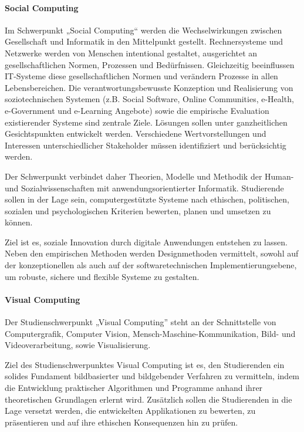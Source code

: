 \paragraph{Social Computing}\label{social-computing}

Im Schwerpunkt „Social Computing`` werden die Wechselwirkungen zwischen
Gesellschaft und Informatik in den Mittelpunkt gestellt. Rechnersysteme
und Netzwerke werden von Menschen intentional gestaltet, ausgerichtet an
gesellschaftlichen Normen, Prozessen und Bedürfnissen. Gleichzeitig
beeinflussen IT-Systeme diese gesellschaftlichen Normen und verändern
Prozesse in allen Lebensbereichen. Die verantwortungsbewusste Konzeption
und Realisierung von soziotechnischen Systemen (z.B. Social Software,
Online Communities, e-Health, e-Government und e-Learning Angebote)
sowie die empirische Evaluation existierender Systeme sind zentrale
Ziele. Lösungen sollen unter ganzheitlichen Gesichtspunkten entwickelt
werden. Verschiedene Wertvorstellungen und Interessen unterschiedlicher
Stakeholder müssen identifiziert und berücksichtig werden.

Der Schwerpunkt verbindet daher Theorien, Modelle und Methodik der
Human- und Sozialwissenschaften mit anwendungsorientierter Informatik.
Studierende sollen in der Lage sein, computergestützte Systeme nach
ethischen, politischen, sozialen und psychologischen Kriterien bewerten,
planen und umsetzen zu können.

Ziel ist es, soziale Innovation durch digitale Anwendungen entstehen zu
lassen. Neben den empirischen Methoden werden Designmethoden vermittelt,
sowohl auf der konzeptionellen als auch auf der softwaretechnischen
Implementierungsebene, um robuste, sichere und flexible Systeme zu
gestalten.

\paragraph{Visual Computing}\label{visual-computing}

Der Studienschwerpunkt „Visual Computing'' steht an der Schnittstelle
von Computergrafik, Computer Vision, Mensch-Maschine-Kommunikation,
Bild- und Videoverarbeitung, sowie Visualisierung.

Ziel des Studienschwerpunktes Visual Computing ist es, den Studierenden
ein solides Fundament bildbasierter und bildgebender Verfahren zu
vermitteln, indem die Entwicklung praktischer Algorithmen und Programme
anhand ihrer theoretischen Grundlagen erlernt wird. Zusätzlich sollen
die Studierenden in die Lage versetzt werden, die entwickelten
Applikationen zu bewerten, zu präsentieren und auf ihre ethischen
Konsequenzen hin zu prüfen.

